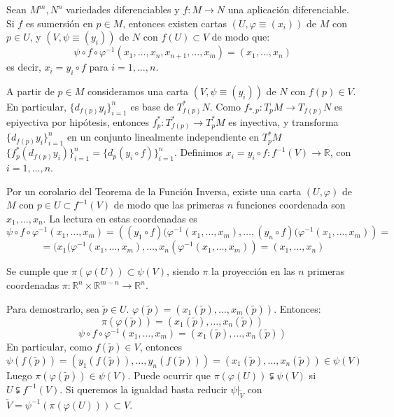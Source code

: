 \begin{teo}
Sean $M^m, N^n$ variedades diferenciables y $f:M \to N$ una aplicación diferenciable. Si $f$ es sumersión en $p \in M$, entonces existen cartas $(U,\varphi\equiv (x_i))$ de $M$ con $p \in U$, y $(V,\psi \equiv (y_i))$ de $N$ con $f(U) \subset V$ de modo que:
$$\psi \circ f \circ \varphi^{-1}(x_1,\dots,x_n,x_{n+1},\dots,x_m) = (x_1,\dots,x_n)$$
es decir, $x_i = y_i \circ f$ para $i = 1,\dots,n$.
\end{teo}
\begin{dem}
A partir de $p \in M$ consideramos una carta $(V,\psi\equiv(y_i))$ de $N$ con $f(p) \in V$. En particular, $\{d_{f(p)}y_i\}_{i=1}^n$ es base de $T_{f(p)}^* N$. Como $f_{*,p}:T_pM \to T_{f(p)}N$ es epiyectiva por hipótesis, entonces $f^*_p:T^*_{f(p)} \to T^*_p M$ es inyectiva, y transforma $\{d_{f(p)}y_i\}_{i=1}^n$ en un conjunto linealmente independiente en $T_p^*M$ $\{f^*_p(d_{f(p)}y_i)\}_{i=1}^n = \{d_p(y_i \circ f)\}_{i=1}^n$. Definimos $x_i = y_i \circ f : f^{-1}(V) \to \mathbb{R}$, con $i = 1,\dots,n$.

Por un corolario del Teorema de la Función Inversa, existe una carta $(U,\varphi)$ de $M$ con $p \in U \subset f^{-1}(V)$ de modo que las primeras $n$ funciones coordenada son $x_1,\dots,x_n$. La lectura en estas coordenadas es
$$\psi \circ f \circ \varphi^{-1} (x_1,\dots,x_m) = \left((y_1 \circ f)(\varphi^{-1}(x_1,\dots,x_m), \dots, (y_n\circ f)(\varphi^{-1}(x_1,\dots,x_m)\right) = $$ $$ =(x_1(\varphi^{-1}(x_1,\dots,x_m), \dots, x_n(\varphi^{-1}(x_1,\dots,x_m))=(x_1,\dots,x_n)$$
\end{dem}

\begin{obs}
Se cumple que $\pi(\varphi(U)) \subset \psi(V)$, siendo $\pi$ la proyección en las $n$ primeras coordenadas $\pi:\mathbb{R}^n \times \mathbb{R}^{m-n} \to \mathbb{R}^n$.

Para demostrarlo, sea $\tilde{p} \in U$. $\varphi(\tilde{p})= (x_1(\tilde{p}),\dots,x_m(\tilde{p}))$. Entonces:
$$\pi(\varphi(\tilde{p})) = (x_1(\tilde{p}),\dots,x_n(\tilde{p}))$$
$$\psi \circ f \circ \varphi^{-1}(x_1,\ldots, x_m) = (x_1(\tilde{p}),\dots,x_n(\tilde{p}))$$
En particular, como $f(\tilde{p}) \in V$, entonces
$$\psi(f(\tilde{p})) = (y_1(f(\tilde{p})), \dots, y_n(f(\tilde{p}))) = (x_1(\tilde{p}), \dots, x_n(\tilde{p})) \in \psi(V)$$
Luego $\pi(\varphi(\tilde{p})) \in \psi(V)$. Puede ocurrir que $\pi(\varphi(U)) \subsetneqq \psi(V)$ si $U \subsetneqq f^{-1}(V)$. Si queremos la igualdad basta reducir $\psi|_{\tilde{V}}$ con $\tilde{V} = \psi^{-1}(\pi(\varphi(U))) \subset V$.
\end{obs}

